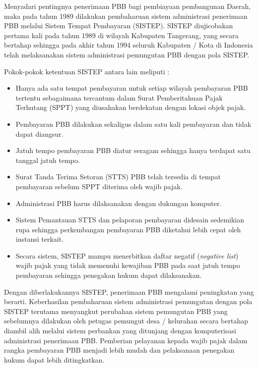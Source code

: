 \documentclass[pdftex,12pt, oneside]{article}
\begin{document}
Menyadari pentingnya penerimaan PBB bagi pembiayaan pembangunan Daerah, maka pada tahun 1989 dilakukan pembaharuan sistem administrasi penerimaan PBB melalui Sistem Tempat Pembayaran (SISTEP). SISTEP diujicobakan pertama kali pada tahun 1989 di wilayah Kabupaten Tangerang, yang secara bertahap sehingga pada akhir tahun 1994 seluruh Kabupaten / Kota di Indonesia telah melaksanakan sistem administrasi pemungutan PBB dengan pola SISTEP.

Pokok-pokok ketentuan SISTEP antara lain meliputi : 

\begin{itemize}

	\item Hanya ada satu tempat pembayaran untuk setiap wilayah pembayaran PBB tertentu sebagaimana tercantum dalam Surat Pemberitahuan Pajak Terhutang (SPPT) yang diusahakan berdekatan dengan lokasi objek pajak.
	
	\item Pembayaran PBB dilakukan sekaligus dalam satu kali pembayaran dan tidak dapat diangsur.
	
	\item Jatuh tempo pembayaran PBB diatur seragam sehingga hanya terdapat satu tanggal jatuh tempo.
	
	\item Surat Tanda Terima Setoran (STTS) PBB telah tersedia di tempat pembayaran sebelum SPPT diterima oleh wajib pajak.
	
	\item Administrasi PBB harus dilaksanakan dengan dukungan komputer.
	
	\item Sistem Pemantauan STTS dan pelaporan pembayaran didesain sedemikian rupa sehingga perkembangan pembayaran PBB diketahui lebih cepat oleh instansi terkait.
	
	\item Secara sistem, SISTEP mampu menerbitkan daftar negatif (\textit{negative list}) wajib pajak yang tidak memenuhi kewajiban PBB pada saat jatuh tempo pembayaran sehingga penegakan hukum dapat dilaksanakan.
	
\end{itemize}

Dengan diberlakukannya SISTEP, penerimaan PBB mengalami peningkatan yang berarti. Keberhasilan pembaharuan sistem administrasi pemungutan dengan pola SISTEP terutama menyangkut perubahan sistem pemungutan PBB yang sebelumnya dilakukan oleh petugas pemungut desa / kelurahan secara bertahap diambil alih melalui sistem perbankan yang ditunjang dengan komputerisasi administrasi penerimaan PBB. Pemberian pelayanan kepada wajib pajak dalam rangka pembayaran PBB menjadi lebih mudah dan pelaksanaan penegakan hukum dapat lebih ditingkatkan.
\end{document}
